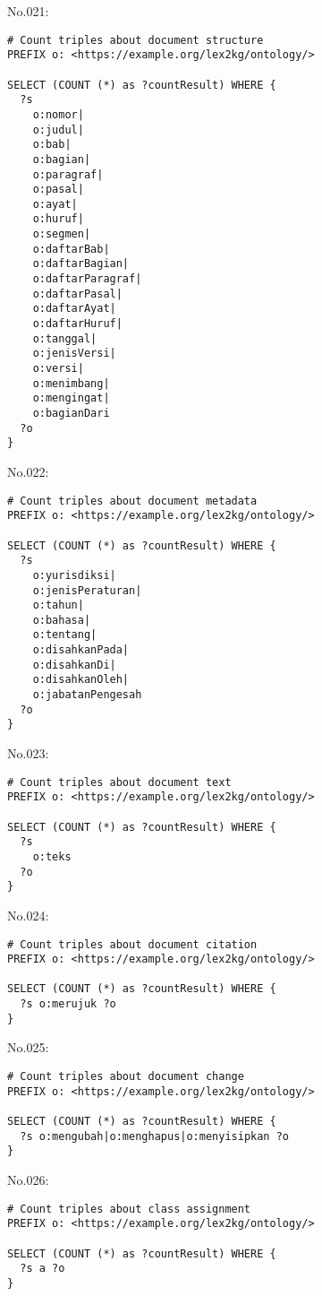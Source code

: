\noindent No.021:
\begin{lstlisting}
# Count triples about document structure
PREFIX o: <https://example.org/lex2kg/ontology/>

SELECT (COUNT (*) as ?countResult) WHERE {
  ?s
    o:nomor|
    o:judul|
    o:bab|
    o:bagian|
    o:paragraf|
    o:pasal|
    o:ayat|
    o:huruf|
    o:segmen|
    o:daftarBab|
    o:daftarBagian|
    o:daftarParagraf|
    o:daftarPasal|
    o:daftarAyat|
    o:daftarHuruf|
    o:tanggal|
    o:jenisVersi|
    o:versi|
    o:menimbang|
    o:mengingat|
    o:bagianDari
  ?o
} 
\end{lstlisting}


\noindent No.022:
\begin{lstlisting}
# Count triples about document metadata
PREFIX o: <https://example.org/lex2kg/ontology/>

SELECT (COUNT (*) as ?countResult) WHERE {
  ?s
    o:yurisdiksi|
    o:jenisPeraturan|
    o:tahun|
    o:bahasa|
    o:tentang|
    o:disahkanPada|
    o:disahkanDi|
    o:disahkanOleh|
    o:jabatanPengesah
  ?o
} 
\end{lstlisting}


\noindent No.023:
\begin{lstlisting}
# Count triples about document text
PREFIX o: <https://example.org/lex2kg/ontology/>

SELECT (COUNT (*) as ?countResult) WHERE {
  ?s
    o:teks
  ?o
} 
\end{lstlisting}


\noindent No.024:
\begin{lstlisting}
# Count triples about document citation
PREFIX o: <https://example.org/lex2kg/ontology/>

SELECT (COUNT (*) as ?countResult) WHERE {
  ?s o:merujuk ?o
} 

\end{lstlisting}


\noindent No.025:
\begin{lstlisting}
# Count triples about document change
PREFIX o: <https://example.org/lex2kg/ontology/>

SELECT (COUNT (*) as ?countResult) WHERE {
  ?s o:mengubah|o:menghapus|o:menyisipkan ?o
} 

\end{lstlisting}


\noindent No.026:
\begin{lstlisting}
# Count triples about class assignment
PREFIX o: <https://example.org/lex2kg/ontology/>

SELECT (COUNT (*) as ?countResult) WHERE {
  ?s a ?o
} 

\end{lstlisting}


